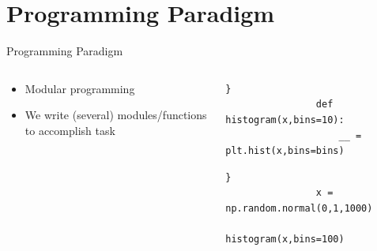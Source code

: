 \documentclass[aspectratio=169]{beamer}
\begin{document}
\section{Programming Paradigm}
%
%
%
%
\begin{frame}[fragile]{Programming Paradigm}
     \begin{columns}
        \begin{column}{0.49\textwidth}
            \begin{itemize}
                \item Modular programming
                \item We write (several) modules/functions to accomplish task
            \end{itemize}
        \end{column}
        \begin{column}{0.49\textwidth}

            \begin{verbatim}}
                def histogram(x,bins=10):
                    __ = plt.hist(x,bins=bins)
            \end{verbatim}
            \begin{verbatim}}
                x = np.random.normal(0,1,1000)
                histogram(x,bins=100)
            \end{verbatim}
        \end{column}
    \end{columns}
\end{frame} 
%
%
\end{document}
